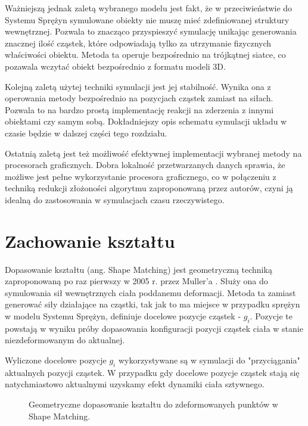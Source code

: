 Ważniejszą jednak zaletą wybranego modelu jest fakt, że w przeciwieństwie do
Systemu Sprężyn symulowane obiekty nie muszę mieć
zdefiniowanej struktury wewnętrznej. Pozwala to znacząco przyspieszyć symulację
unikając generowania znacznej ilość cząstek, które odpowiadają tylko za
utrzymanie fizycznych właściwości obiektu. Metoda ta operuje bezpośrednio na
trójkątnej siatce, co pozawala wczytać obiekt bezpośrednio z formatu modeli
3D.

Kolejną zaletą użytej techniki symulacji jest jej stabilność. Wynika ona z
operowania metody bezpośrednio na pozycjach cząstek zamiast na siłach. Pozwala
to na bardzo prostą implementację reakcji na zderzenia z innymi obiektami czy
samym sobą. Dokładniejszy opis schematu symulacji układu w czasie będzie w
dalszej części tego rozdziału.

Ostatnią zaletą jest też możliwość efektywnej implementacji wybranej metody na
procesorach graficznych. Dobra lokalność przetwarzanych danych sprawia, że
możliwe jest pełne wykorzystanie procesora graficznego, co w połączeniu z
techniką redukcji złożoności algorytmu zaproponowaną przez autorów, czyni ją
idealną do zastosowania w symulacjach czasu rzeczywistego.

\section{Zachowanie kształtu}
\label{sec:shape}
Dopasowanie kształtu (ang. Shape Matching) jest geometryczną techniką
zaproponowaną po raz pierwszy w 2005 r. przez Muller'a \cite{shape}. Służy ona do
symulowania sił wewnętrznych ciała poddanemu deformacji. Metoda ta zamiast
generować siły działające na cząstki, tak jak to ma miejsce w przypadku
sprężyn w modelu Systemu Sprężyn, definiuje docelowe pozycje cząstek - $g_i$.
Pozycje te powstają w wyniku próby dopasowania konfiguracji 
pozycji cząstek ciała w stanie niezdeformowanym do aktualnej.

Wyliczone docelowe pozycje $g_i$ wykorzystywane są w symulacji do "przyciągania"
aktualnych pozycji cząstek. W przypadku gdy docelowe pozycje cząstek stają się
natychmiastowo aktualnymi uzyskamy efekt dynamiki ciała sztywnego.

\begin{figure}[ht]
\centering

\caption{Geometryczne dopasowanie kształtu do zdeformowanych punktów w Shape Matching.}
\label{shape-matching}
\end{figure}

